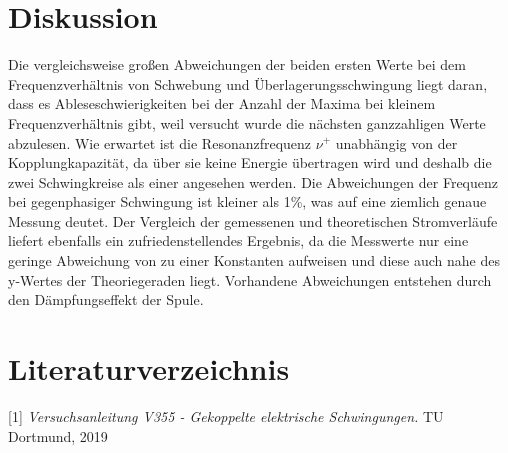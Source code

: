 \documentclass[titlepage = firstcover]{scrartcl}
\begin{document}
\section{Diskussion}
Die vergleichsweise großen Abweichungen der beiden ersten Werte bei dem Frequenzverhältnis von Schwebung und Überlagerungsschwingung liegt daran, dass es 
Ableseschwierigkeiten bei der Anzahl der Maxima bei kleinem Frequenzverhältnis gibt, weil versucht wurde die nächsten ganzzahligen Werte abzulesen.
Wie erwartet ist die Resonanzfrequenz $\nu^+$ unabhängig von der Kopplungkapazität, da über sie keine Energie übertragen wird und deshalb die zwei
Schwingkreise als einer angesehen werden. Die Abweichungen der Frequenz bei gegenphasiger Schwingung ist kleiner als 1\%, was auf eine ziemlich genaue
Messung deutet. Der Vergleich der gemessenen und theoretischen Stromverläufe liefert ebenfalls ein zufriedenstellendes Ergebnis, da die Messwerte nur eine
geringe Abweichung von zu einer Konstanten aufweisen und diese auch nahe des y-Wertes der Theoriegeraden liegt. Vorhandene Abweichungen entstehen durch den
Dämpfungseffekt der Spule. 

\newpage
\section{Literaturverzeichnis}
        [1] \textit{Versuchsanleitung V355 - Gekoppelte elektrische Schwingungen.} TU Dortmund, 2019 \newline
\end{document}
